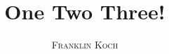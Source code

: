 \documentclass[a4paper,11pt,oneside]{book}
\title{\Huge \textbf{One Two Three!}}
\author{\textsc{Franklin Koch}}
\begin{document}
\sloppy

\frontmatter
\maketitle

\tableofcontents

\mainmatter

% 
% 






\end{document}
